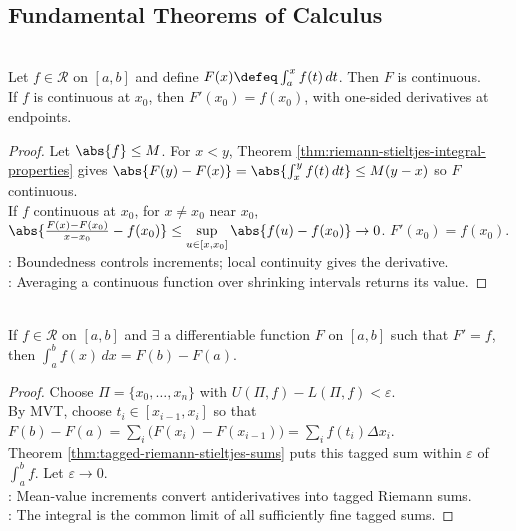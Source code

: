 \subsection{Fundamental Theorems of Calculus}

\begin{theorem} \label{thm:integral-function-continuity-and-derivative} \\
Let $f\in\mathcal{R}$ on $[a,b]$ and define $F(x)\defeq\int_a^x f(t)\,dt$. Then $F$ is continuous.\\
If $f$ is continuous at $x_0$, then $F'(x_0)=f(x_0)$, with one-sided derivatives at endpoints.
\begin{proof}
Let $\abs{f}\leq M$. For $x<y$, Theorem \ref{thm:riemann-stieltjes-integral-properties} gives $\abs{F(y)-F(x)}=\abs{\int_x^y f(t)\,dt}\leq M(y-x)$ so $F$ continuous.\\
If $f$ continuous at $x_0$, for $x\neq x_0$ near $x_0$, $\abs{\frac{F(x)-F(x_0)}{x-x_0}-f(x_0)} \leq \sup\limits_{u \in [x, x_0]}\abs{f(u)-f(x_0)}\to0$. $F'(x_0)=f(x_0)$.\\
: Boundedness controls increments; local continuity gives the derivative.\\
: Averaging a continuous function over shrinking intervals returns its value.
\end{proof}
\end{theorem}

\begin{theorem} \label{thm:fundamental-theorem-calculus-riemann} \\
If $f\in\mathcal{R}$ on $[a,b]$ and $\exists$ a differentiable function $F$ on $[a,b]$ such that $F'=f$, then $\int_a^b f(x)\,dx=F(b)-F(a)$.
\begin{proof}
Choose $\Pi=\{x_0,\ldots,x_n\}$ with $U(\Pi,f)-L(\Pi,f)<\varepsilon$.\\
By MVT, choose $t_i\in[x_{i-1},x_i]$ so that $F(b)-F(a)=\sum\limits_i\bigl(F(x_i)-F(x_{i-1})\bigr)=\sum\limits_i f(t_i)\Delta x_i$.\\
Theorem \ref{thm:tagged-riemann-stieltjes-sums} puts this tagged sum within $\varepsilon$ of $\int_a^b f$. Let $\varepsilon\to0$.\\
: Mean-value increments convert antiderivatives into tagged Riemann sums.\\
: The integral is the common limit of all sufficiently fine tagged sums.
\end{proof}
\end{theorem}

